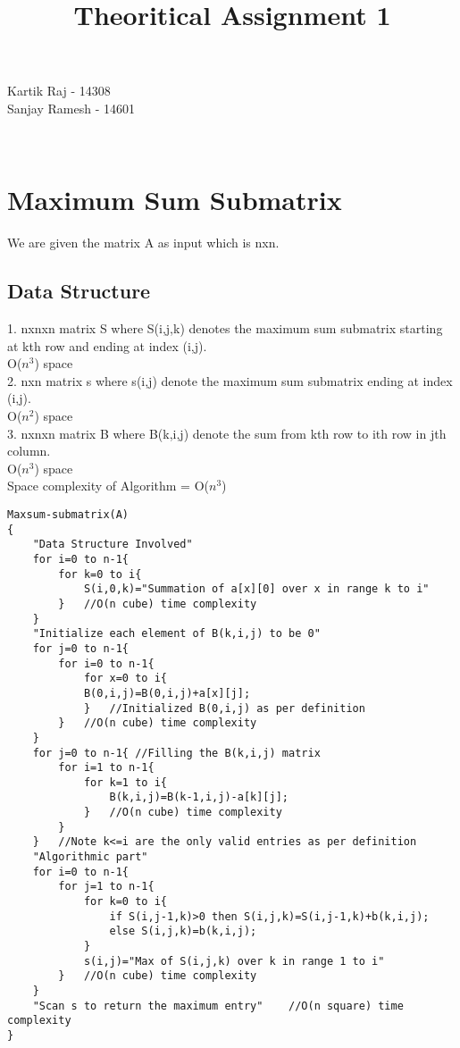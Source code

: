 \documentclass[a4paper,11pt]{article}
\makeatletter
\theoremstyle{mytheor}
\renewcommand{\maketitle}{
\begin{center}
\vspace{2ex}
{\huge \textsc{\@title}}
\vspace{1ex}
\\

\vspace{4ex}
\end{center}
}
\makeatother
\begin{document}
\title{Theoritical Assignment 1}

\begin{flushright}
Kartik Raj - 14308\\
Sanjay Ramesh - 14601
\end{flushright}
\maketitle

\section*{Maximum Sum Submatrix}

We are given the matrix A as input which is nxn.
\subsection*{Data Structure}
1. nxnxn matrix S where S(i,j,k) denotes the maximum sum submatrix starting at kth row and ending at index (i,j).\\ O($n^3$) space\\
2. nxn matrix s where s(i,j) denote the maximum sum submatrix ending at index (i,j).\\ O($n^2$) space\\
3. nxnxn matrix B where B(k,i,j) denote the sum from kth row to ith row in jth column.\\ O($n^3$) space\\
Space complexity of Algorithm = O($n^3$)
\begin{lstlisting}[label={list:first},caption=Algorithm to calculate Maximum Sum Submatrix]
Maxsum-submatrix(A)
{
	"Data Structure Involved"
	for i=0 to n-1{
		for k=0 to i{
            S(i,0,k)="Summation of a[x][0] over x in range k to i"
    	}	//O(n cube) time complexity
	}
    "Initialize each element of B(k,i,j) to be 0"
    for j=0 to n-1{
    	for i=0 to n-1{
        	for x=0 to i{
            B(0,i,j)=B(0,i,j)+a[x][j];
            }	//Initialized B(0,i,j) as per definition
        }	//O(n cube) time complexity
    }
    for j=0 to n-1{	//Filling the B(k,i,j) matrix
    	for i=1 to n-1{
        	for k=1 to i{
            	B(k,i,j)=B(k-1,i,j)-a[k][j];
            }	//O(n cube) time complexity
        }
    }	//Note k<=i are the only valid entries as per definition
    "Algorithmic part"
    for i=0 to n-1{
    	for j=1 to n-1{
        	for k=0 to i{
            	if S(i,j-1,k)>0 then S(i,j,k)=S(i,j-1,k)+b(k,i,j);
                else S(i,j,k)=b(k,i,j);
            }
            s(i,j)="Max of S(i,j,k) over k in range 1 to i"
        }	//O(n cube) time complexity
    }
    "Scan s to return the maximum entry"	//O(n square) time complexity
}
\end{lstlisting}
\end{document}
